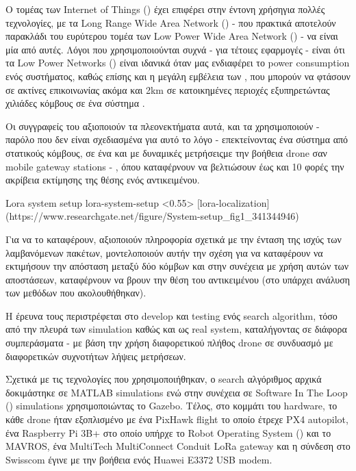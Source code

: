 Ο τομέας των Internet of Things () έχει επιφέρει στην έντονη χρήση\udot για πολλές τεχνολογίες, με τα Long Range Wide Area Network () - που πρακτικά αποτελούν παρακλάδι του ευρύτερου τομέα των Low Power Wide Area Network () - να είναι μία από αυτές. Λόγοι που χρησιμοποιούνται συχνά - για τέτοιες εφαρμογές - είναι ότι τα Low Power Networks () είναι ιδανικά όταν μας ε\-νδια\-φέ\-ρει το 
power consumption ενός συστήματος, καθώς επίσης και η μεγάλη εμβέλεια των , που μπορούν να φτάσουν σε ακτίνες επικοινωνίας ακόμα και 2km σε κατοικημένες περιοχές εξυπηρετώντας χιλιάδες κόμβους σε ένα σύστημα \cite{lora-localization}.

Οι συγγραφείς του \cite{lora-localization} αξιοποιούν τα πλεονεκτήματα αυτά,
και τα χρησιμοποιούν - παρόλο που δεν είναι σχεδιασμένα για αυτό το λόγο - επεκτείνοντας ένα σύστημα από στατικούς κόμβους, σε ένα και με δυναμικές μετρήσεις\udot με την βοήθεια drone σαν  mobile gateway stations - , όπου καταφέρνουν να βελτιώσουν έως και 10 φορές την ακρίβεια εκτίμησης της θέσης ενός αντικειμένου.

%
{Lora system setup}%
{lora-system-setup}%
<0.55>%
[lora-localization](https://www.researchgate.net/figure/System-setup_fig1_341344946)

Για να το καταφέρουν, αξιοποιούν πληροφορία σχετικά με την ένταση της ισχύς των λαμβανόμενων πακέτων, μοντελοποιούν αυτήν την σχέση για να καταφέρουν να εκτιμήσουν την απόσταση μεταξύ δύο κόμβων και στην συνέχεια με χρήση αυτών των αποστάσεων, καταφέρνουν να 
βρουν την θέση του αντικειμένου (στο  υπάρχει ανάλυση των μεθόδων που ακολουθήθηκαν).

Η έρευνα τους περιστρέφεται στο develop και testing ενός search algorithm, τόσο από την πλευρά των simulation καθώς και ως real system, καταλήγοντας σε διάφορα συμπεράσματα - με βάση την χρήση διαφορετικού πλήθος drone σε συνδυασμό με διαφορετικών συχνοτήτων λήψεις μετρήσεων.

Σχετικά με τις τεχνολογίες που χρησιμοποιήθηκαν, ο search αλγόριθμος αρχικά δοκιμάστηκε σε 
MATLAB simulations ενώ στην συνέχεια σε Software In The Loop () simulations χρησιμοποιώντας 
το Gazebo. Τέλος, στο κομμάτι του hardware, το κάθε drone ήταν εξοπλισμένο με ένα PixHawk flight το οποίο έτρεχε PX4 autopilot, ένα Raspberry Pi 3B+ στο οποίο υπήρχε το Robot Operating System () και το MAVROS, ένα MultiTech MultiConnect Conduit LoRa gateway και η σύνδεση στο Swisscom  έγινε με την βοήθεια ενός Huawei E3372 USB modem.

